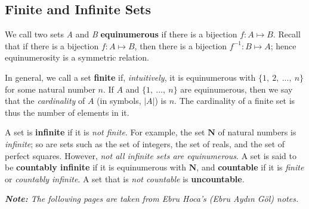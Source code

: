 \documentclass{article}
\newcounter{example}
\begin{document}
\begin{multicols}{2}
\section{Finite and Infinite Sets}

We call two sets \textit{A} and \textit{B} \textbf{equinumerous} if there is a bijection $f: A \mapsto B$. Recall that if there is a bijection $f: A \mapsto B$, then there is a bijection $f^{-1}: B \mapsto A$; hence equinumerosity is a symmetric relation.

In general, we call a set \textbf{finite} if, \textit{intuitively}, it is equinumerous with $\{1,\ 2,\ ...,\ n\}$ for some natural number $n$. If $A$ and $\{1,\ ...,\ n\}$ are equinumerous, then we say that the \textit{cardinality} of $A$ (in symbols, $|A|$) is $n$. The cardinality of a finite set is thus the number of elements in it.

A set is \textbf{infinite} if it is \textit{not finite}. For example, the set $\mathbf{N}$ of natural numbers is \textit{infinite}; so are sets such as the set of integers, the set of reals, and the set of perfect squares. However, \textit{not all infinite sets are equinumerous}. A set is said to be \textbf{countably infinite} if it is equinumerous with $\mathbf{N}$, and \textbf{countable} if it is \textit{finite} or \textit{countably infinite}. A set that is \textit{not countable} is \textbf{uncountable}. 
\end{multicols}

\textit{\textbf{Note:} The following pages are taken from Ebru Hoca's (Ebru Aydın Göl) notes.}




\end{document}

